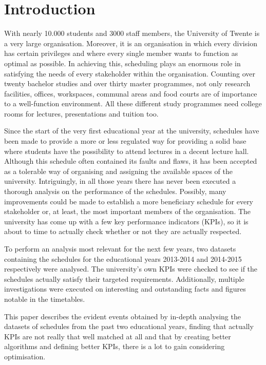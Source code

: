 \section{Introduction}
With nearly 10.000 students and 3000 staff members, the University of Twente is a very large organisation\cite{stats_uTwente}. Moreover, it is an organisation in which every division has certain privileges and where every single member wants to function as optimal as possible. In achieving this, scheduling plays an enormous role in satisfying the needs of every stakeholder within the organisation. Counting over twenty bachelor studies and over thirty master programmes, not only research facilities, offices, workspaces, communal areas and food courts are of importance to a well-function environment. All these different study programmes need college rooms for lectures, presentations and tuition too.

Since the start of the very first educational year at the university, schedules have been made to provide a more or less regulated way for providing a solid base where students have the possibility to attend lectures in a decent lecture hall. Although this schedule often contained its faults and flaws, it has been accepted as a tolerable way of organising and assigning the available spaces of the university. Intriguingly, in all those years there has never been executed a thorough analysis on the performance of the schedules. Possibly, many improvements could be made to establish a more beneficiary schedule for every stakeholder or, at least, the most important members of the organisation. The university has come up with a few key performance indicators (KPIs), so it is about to time to actually check whether or not they are actually respected.

To perform an analysis most relevant for the next few years, two datasets containing the schedules for the educational years 2013-2014 and 2014-2015 respectively were analysed. The university’s own KPIs were checked to see if the schedules actually satisfy their targeted requirements. Additionally, multiple investigations were executed on interesting and outstanding facts and figures notable in the timetables.

This paper describes the evident events obtained by in-depth analysing the datasets of schedules from the past two educational years, finding that actually KPIs are not really that well matched at all and that by creating better algorithms and defining better KPIs, there is a lot to gain considering optimisation.